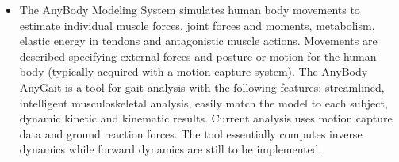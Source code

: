 \documentclass[12pt,a4paper,twoside]{article}
\begin{document}
\begin{itemize}
\item The AnyBody Modeling System simulates human body movements to estimate individual muscle forces, joint forces and moments, metabolism, elastic energy in tendons and antagonistic muscle actions. Movements are described specifying external forces and posture or motion for the human body (typically acquired with a motion capture system). The AnyBody AnyGait is a tool for gait analysis with the following features: streamlined, intelligent musculoskeletal analysis, easily match the model to each subject, dynamic kinetic and kinematic results. Current analysis uses motion capture data and ground reaction forces. The tool essentially computes inverse dynamics while forward dynamics are still to be implemented.

\end{itemize}




\end{document}
